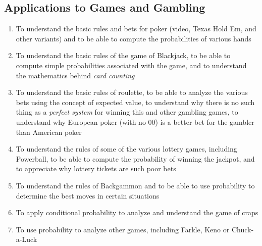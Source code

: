 \documentclass[11pt]{article}
\begin{document}
\subsection{Applications to Games and Gambling}
\begin{enumerate}
\item To understand the basic rules and bets for poker
(video, Texas Hold Em, and other variants)
and to be able to compute the probabilities of various hands
\item To understand the basic rules of the game of Blackjack,
to be able to compute simple probabilities associated with the game,
and to understand the mathematics behind {\em card counting}
\item To understand the basic rules of roulette,
to be able to analyze the various bets using the concept of expected value,
to understand why there is no such thing as a {\em perfect system}
for winning this and other gambling games,
to understand why European poker (with no 00)
is a better bet for the gambler than American poker
\item To understand the rules of some of the various lottery games,
including Powerball,
to be able to compute the probability of winning the jackpot,
and to appreciate why lottery tickets are such poor bets
\item To understand the rules of Backgammon and to be able to use
probability to determine the best moves in certain situations
\item To apply conditional probability to analyze
and understand the game of craps
\item To use probability to analyze other games,
including Farkle, Keno or Chuck-a-Luck
\end{enumerate}
\end{document}

